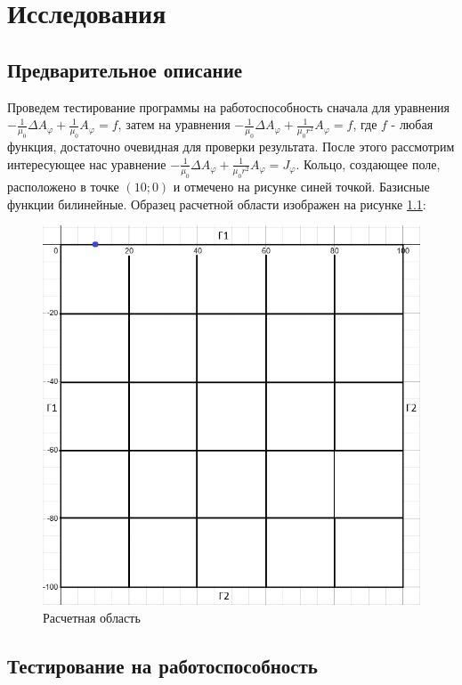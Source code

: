 \chapter{Исследования}

\section{Предварительное описание}

Проведем тестирование программы на работоспособность сначала для уравнения $-\frac{1}{\mu_0} \Delta A_{\varphi} + \frac{1}{\mu_0} A_{\varphi} = f$, затем на уравнения $-\frac{1}{\mu_0} \Delta A_{\varphi} + \frac{1}{\mu_0 r^2} A_{\varphi} = f$, где $f$ - любая функция, достаточно очевидная для проверки результата. После этого рассмотрим интересующее нас уравнение $-\frac{1}{\mu_0} \Delta A_{\varphi} + \frac{1}{\mu_0 r^2} A_{\varphi} = J_{\varphi}$. Кольцо, создающее поле, расположено в точке $(10; 0)$ и отмечено на рисунке синей точкой. Базисные функции билинейные.  Образец расчетной области изображен на рисунке \ref{fig:exampleOfArea}:

\begin{figure}
	\centering
	\includegraphics[width=0.75\linewidth]{images/Тест1.png}
	\caption{Расчетная область}
	\label{fig:exampleOfArea}
\end{figure}

\section{Тестирование на работоспособность}

